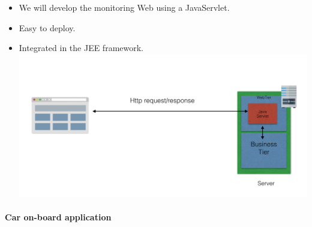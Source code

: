 \documentclass[]{article}
\let\oldparagraph\paragraph
\renewcommand{\paragraph}[1]{\oldparagraph{#1}\mbox{}}
\begin{document}
\begin{itemize}
\item
  We will develop the monitoring Web using a JavaServlet.
\item
  Easy to deploy.
\item
  Integrated in the JEE framework.\newline
  \includegraphics[width=1.00000\textwidth,height=1.00000\textwidth]{./images/webAppArch.png}
\end{itemize}

\paragraph{Car on-board application}\label{car-on-board-application}
\end{document}
